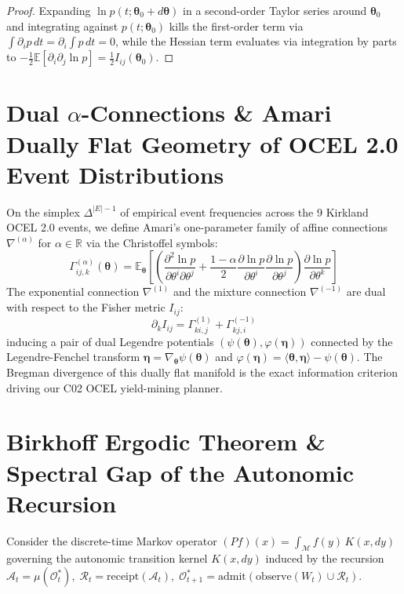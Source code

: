 \documentclass[10pt,twoside,openany]{book}
\theoremstyle{plain}
\theoremstyle{definition}
\theoremstyle{remark}
\newcommand{\Oadm}{\mathcal{O}^*}
\newcommand{\R}{\mathbb{R}}
\newcommand{\E}{\mathbb{E}}
\newcommand{\A}{\mathcal{A}}
\newcommand{\Rrcpt}{\mathcal{R}}
\begin{document}
\begin{proof}
Expanding $\ln p(t; \boldsymbol{\theta}_0 + d\boldsymbol{\theta})$ in a second-order Taylor series around $\boldsymbol{\theta}_0$ and integrating against $p(t; \boldsymbol{\theta}_0)$ kills the first-order term via $\int \partial_i p\,dt = \partial_i \int p\,dt = 0$, while the Hessian term evaluates via integration by parts to $-\frac{1}{2}\E[\partial_i \partial_j \ln p] = \frac{1}{2} I_{ij}(\boldsymbol{\theta}_0)$.
\end{proof}

\section{Dual $\alpha$-Connections \& Amari Dually Flat Geometry of OCEL 2.0 Event Distributions}
On the simplex $\Delta^{|E|-1}$ of empirical event frequencies across the 9 Kirkland OCEL 2.0 events, we define Amari's one-parameter family of affine connections $\nabla^{(\alpha)}$ for $\alpha \in \R$ via the Christoffel symbols:
\begin{equation}
\Gamma_{ij,k}^{(\alpha)}(\boldsymbol{\theta}) = \E_{\boldsymbol{\theta}}\!\left[\left(\frac{\partial^2 \ln p}{\partial \theta^i \partial \theta^j} + \frac{1 - \alpha}{2} \frac{\partial \ln p}{\partial \theta^i} \frac{\partial \ln p}{\partial \theta^j}\right)\frac{\partial \ln p}{\partial \theta^k}\right]
\end{equation}
The exponential connection $\nabla^{(1)}$ and the mixture connection $\nabla^{(-1)}$ are dual with respect to the Fisher metric $I_{ij}$:
\begin{equation}
\partial_k I_{ij} = \Gamma_{ki,j}^{(1)} + \Gamma_{kj,i}^{(-1)}
\end{equation}
inducing a pair of dual Legendre potentials $(\psi(\boldsymbol{\theta}), \varphi(\boldsymbol{\eta}))$ connected by the Legendre-Fenchel transform $\boldsymbol{\eta} = \nabla_{\boldsymbol{\theta}} \psi(\boldsymbol{\theta})$ and $\varphi(\boldsymbol{\eta}) = \langle \boldsymbol{\theta}, \boldsymbol{\eta} \rangle - \psi(\boldsymbol{\theta})$. The Bregman divergence of this dually flat manifold is the exact information criterion driving our C02 OCEL yield-mining planner.

\section{Birkhoff Ergodic Theorem \& Spectral Gap of the Autonomic Recursion}
Consider the discrete-time Markov operator $(P f)(x) = \int_{\mathcal{M}} f(y)\,K(x, dy)$ governing the autonomic transition kernel $K(x, dy)$ induced by the recursion $\A_t = \mu(\Oadm_t),\; \Rrcpt_t = \mathrm{receipt}(\A_t),\; \Oadm_{t+1} = \mathrm{admit}(\mathrm{observe}(W_t) \cup \Rrcpt_t)$.
\end{document}
